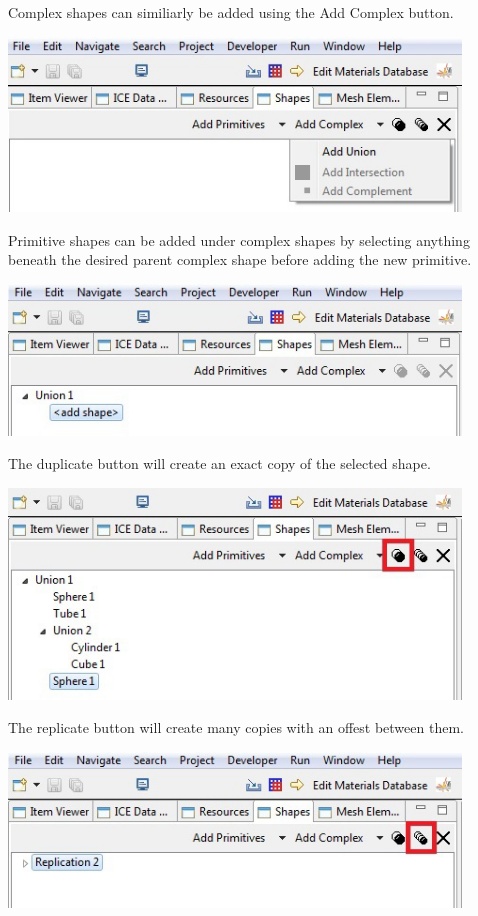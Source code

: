 \documentclass{article}
\begin{document}
Complex shapes can similiarly be added using the Add Complex button.

\begin{center}
\includegraphics[width=12cm]{images/AddComplexShape}
\end{center}

Primitive shapes can be added under complex shapes by selecting anything beneath
the desired parent complex shape before adding the new primitive.

\begin{center}
\includegraphics[width=12cm]{images/ComplexShapeTree}
\end{center}

The duplicate button will create an exact copy of the selected shape.

\begin{center}
\includegraphics[width=12cm]{images/DuplicateButton}
\end{center}

The replicate button will create many copies with an offest between them.

\begin{center}
\includegraphics[width=12cm]{images/ReplicateButton}
\end{center}
\end{document}
